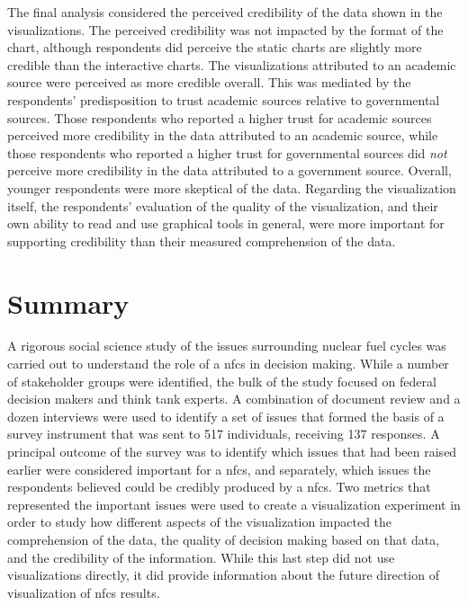 The final analysis considered the perceived credibility of the data shown in
the visualizations.  The perceived credibility was
not impacted by the format of the chart, although respondents did perceive the
static charts are slightly more credible than the interactive charts.  The
visualizations attributed to an academic source were perceived as more
credible overall.  This was mediated by the respondents' predisposition to
trust academic sources relative to governmental sources.  Those respondents
who reported a higher trust for academic sources perceived more credibility in
the data attributed to an academic source, while those respondents who
reported a higher trust for governmental sources did \emph{not} perceive more
credibility in the data attributed to a government source.  Overall, younger
respondents were more skeptical of the data.  Regarding the visualization
itself, the respondents' evaluation of the quality of the visualization, and
their own ability to read and use graphical tools in general, were more
important for supporting credibility than their measured comprehension of the
data.


\section{Summary}

A rigorous social science study of the issues surrounding nuclear fuel cycles
was carried out to understand the role of a \gls{nfcs} in decision making.
While a number of stakeholder groups were identified, the bulk of the study
focused on federal decision makers and think tank experts.  A combination of
document review and a dozen interviews were used to identify a set of issues
that formed the basis of a survey instrument that was sent to 517 individuals,
receiving 137 responses.  A principal outcome of the survey was to identify
which issues that had been raised earlier were considered important for a
\gls{nfcs}, and separately, which issues the respondents believed could be
credibly produced by a \gls{nfcs}.  Two metrics that represented the important
issues were used to create a visualization experiment in order to study how
different aspects of the visualization impacted the comprehension of the data,
the quality of decision making based on that data, and the credibility of the
information.  While this last step did not use \Cyclus visualizations
directly, it did provide information about the future direction of
visualization of \gls{nfcs} results.
